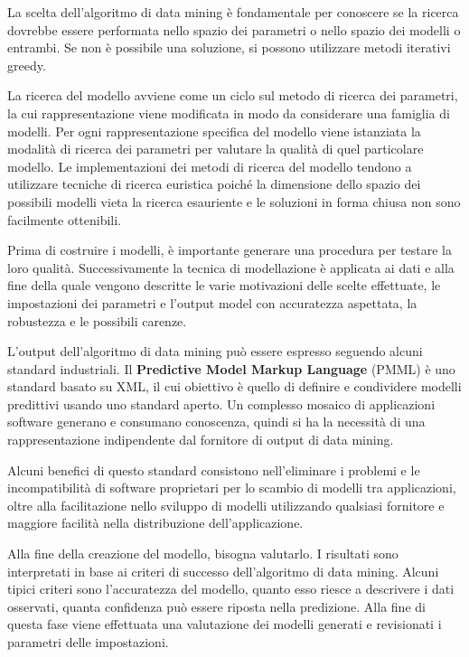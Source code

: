 \documentclass[a4paper]{extarticle}
\begin{document}
La scelta dell'algoritmo di data mining è fondamentale per conoscere se la ricerca dovrebbe essere performata nello spazio dei parametri o nello spazio dei modelli o entrambi. Se non è possibile una soluzione, si possono utilizzare metodi iterativi greedy. 

La ricerca del modello avviene come un ciclo sul metodo di ricerca dei parametri, la cui rappresentazione viene modificata in modo da considerare una famiglia di modelli. Per ogni rappresentazione specifica del modello viene istanziata la modalità di ricerca dei parametri per valutare la qualità di quel particolare modello. Le implementazioni dei metodi di ricerca del modello tendono a utilizzare tecniche di ricerca euristica poiché la dimensione dello spazio dei possibili modelli vieta la ricerca esauriente e le soluzioni in forma chiusa non sono facilmente ottenibili.

Prima di costruire i modelli, è importante generare una procedura per testare la loro qualità. Successivamente la tecnica di modellazione è applicata ai dati e alla fine della quale vengono descritte le varie motivazioni delle scelte effettuate, le impostazioni dei parametri e l'output model con accuratezza aspettata, la robustezza e le possibili carenze.

L'output dell'algoritmo di data mining può essere espresso seguendo alcuni standard industriali. Il \textbf{Predictive Model Markup Language} (PMML) è uno standard basato su XML, il cui obiettivo è quello di definire e condividere modelli predittivi usando uno standard aperto. Un complesso mosaico di applicazioni software generano e consumano conoscenza, quindi si ha la necessità di una rappresentazione indipendente dal fornitore di output di data mining. 

Alcuni benefici di questo standard consistono nell'eliminare i problemi e le incompatibilità di software proprietari per lo scambio di modelli tra applicazioni,  oltre alla facilitazione nello sviluppo di modelli utilizzando qualsiasi fornitore e maggiore facilità nella  distribuzione dell'applicazione.

Alla fine della creazione del modello, bisogna valutarlo. I risultati sono interpretati in base ai criteri di successo dell'algoritmo di data mining. Alcuni tipici criteri sono l'accuratezza del modello, quanto esso riesce a descrivere i dati osservati, quanta confidenza può essere riposta nella predizione. Alla fine di questa fase viene effettuata una valutazione dei modelli generati e revisionati i parametri delle impostazioni. 
\end{document}
